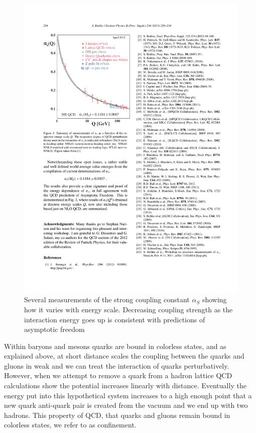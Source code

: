 \begin{figure}[htbp]
\begin{center}
\includegraphics[scale=1.3]{Plots/Intro/asymp_free.pdf}
\end{center}
\caption[Asymptotic Freedom]{Several measurements of the strong coupling constant $\alpha_S$ showing how it varies with energy scale. Decreasing coupling strength as the interaction energy goes up is consistent with predictions of asymptotic freedom}
\label{fig:a_free}
\end{figure}

Within baryons and mesons quarks are bound in colorless states, and as explained above, at short distance scales the coupling between the quarks and gluons in weak and we can treat the interaction of quarks perturbatively. However, when we attempt to remove a quark from a hadron lattice QCD calculations show the potential increases linearly with distance. Eventually the energy put into this hypothetical system increases to a high enough point that a new quark anti-quark pair is created from the vacuum and we end up with two hadrons. This property of QCD, that quarks and gluons remain bound in colorless states, we refer to as confinement. 

